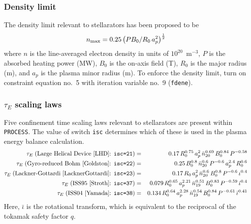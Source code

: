 \documentclass[11pt,a4paper]{report}
\newcommand{\process}{\mbox{\texttt{PROCESS}}}
\begin{document}
\subsubsection{Density limit}

The density limit relevant to stellarators has been proposed to be~\cite{LHD}
\begin{equation}
n_{\mbox{\scriptsize max}} = 0.25\left( P B_0 / R_0 \, a_p^2\right)^\frac{1}{2}
\end{equation}
where $n$ is the line-averaged electron density in units of
$10^{20}$~m$^{-3}$, $P$ is the absorbed heating power (MW), $B_0$ is the
on-axis field (T), $R_0$ is the major radius (m), and $a_p$ is the plasma
minor radius (m). To enforce the density limit, turn on constraint equation
no.\ 5 with iteration variable no.\ 9 (\texttt{fdene}).

\subsubsection{$\tau_E$ scaling laws}


Five confinement time scaling laws relevant to stellarators are present
within \process. The value of switch \texttt{isc} determines which of these is
used in the plasma energy balance calculation.
\begin{eqnarray}
\tau_E\; (\mbox{Large Helical Device~\cite{LHD}: \texttt{isc=21}})
& = & 0.17 \, R_0^{0.75} \, a_p^2 \, \bar{n}_{20}^{0.69} \, B_0^{0.84} \, P^{-0.58} \\
\tau_E\; (\mbox{Gyro-reduced Bohm~\cite{Goldston}: \texttt{isc=22}})
 & = & 0.25 \, B_0^{0.8} \, \bar{n}_{20}^{0.6} \, P^{-0.6} \, a_p^{2.4} \, R_0^{0.6} \\
\tau_E\; (\mbox{Lackner-Gottardi~\cite{LacknerGottardi}: \texttt{isc=23}})
& = & 0.17 \, R_0 \, a_p^2 \, \bar{n}_{20}^{0.6} \, B_0^{0.8} \, P^{-0.6} \, \iota^{0.4} \\
\tau_E\; (\mbox{ISS95~\cite{Stroth}: \texttt{isc=37}})
& = & 0.079 \, R_0^{0.65} \, a_p^{2.21} \, \bar{n}_{19}^{0.51} \, B_0^{0.83}
\, P^{-0.59} \, \bar{\iota}^{0.4} \\
\tau_E\; (\mbox{ISS04~\cite{Yamada}: \texttt{isc=38}})
& = & 0.134 \, R_0^{0.64} \, a_p^{2.28} \, \bar{n}_{19}^{0.54} \, B_0^{0.84}
\, P^{-0.61} \, \bar{\iota}^{0.41}
\end{eqnarray}
Here, $\bar{\iota}$ is the rotational transform, which is equivalent to the reciprocal
of the tokamak safety factor $q$.
\end{document}
